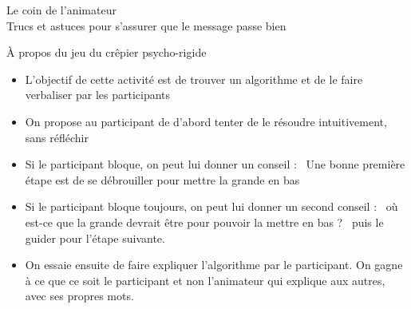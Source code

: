 \documentclass[final,hyperref={pdfpagelabels=false}]{beamer}
\renewcommand*{\large}{\fontsize{\resultlargeX}{\resultlargeY}\selectfont}
\begin{document}
\begin{frame}{Le coin de l'animateur\\[-5pt]
  {\large Trucs et astuces pour s'assurer que le message passe bien}}
  \begin{block}{À propos du jeu du crêpier psycho-rigide}
    \begin{itemize}
    \item L'objectif de cette activité est de trouver un algorithme et de
    le faire verbaliser par les participants
    \item On propose au participant de d'abord tenter de le résoudre
    intuitivement, sans réfléchir
    \item Si le participant bloque, on peut lui donner un conseil : \og~Une
    bonne première étape est de se débrouiller pour mettre la grande en bas~\fg
    \item Si le participant bloque toujours, on peut lui donner un second
    conseil : \og~où est-ce que la grande devrait être pour pouvoir la mettre en
    bas ? ~\fg puis le guider pour l'étape suivante.
    \item On essaie ensuite de faire expliquer l'algorithme par le participant.
    On gagne à ce que ce soit le participant et non l'animateur qui explique aux
    autres, avec ses propres mots.
    \end{itemize}
  \end{block}


\end{frame}
\end{document}
